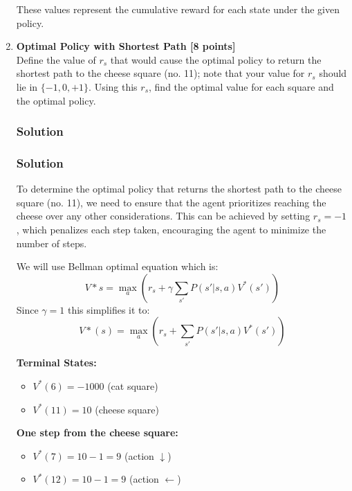 \documentclass{article}
\begin{document}
\begin{enumerate}[label=(\alph*)]
    These values represent the cumulative reward for each state under the given policy.
    \item \textbf{Optimal Policy with Shortest Path [8 points]} \\
    Define the value of $r_s$ that would cause the optimal policy to return the shortest path to the cheese square (no. 11); note that your value for $r_s$ should lie in $\{-1, 0, +1\}$. Using this $r_s$, find the optimal value for each square and the optimal policy.
    \subsubsection*{Solution}
    \subsubsection*{Solution}
    To determine the optimal policy that returns the shortest path to the cheese square (no. 11), we need to ensure that the agent prioritizes reaching the cheese over any other considerations. This can be achieved by setting \( r_s = -1 \), which penalizes each step taken, encouraging the agent to minimize the number of steps.


    We will use Bellman optimal equation which is:
    \[
    V*s = \max_a \left( r_s + \gamma \sum_{s'} P(s'|s, a)V^*(s') \right)
    \]
    Since $\gamma  = 1$ this simplifies it to:
    \[
    V*(s) = \max_a \left( r_s + \sum_{s'} P(s'|s, a)V^*(s') \right)
    \]

    \textbf{Terminal States:}
    \begin{itemize}
        \item \( V^*(6) = -1000 \) (cat square)
        \item \( V^*(11) = 10 \) (cheese square)
    \end{itemize}

    \textbf{One step from the cheese square:}
    \begin{itemize}
        \item \( V^*(7) = 10 - 1 = 9 \) (action $\downarrow$)
        \item \( V^*(12) = 10 - 1 = 9 \) (action $\leftarrow$)
    \end{itemize}


\end{enumerate}
\end{document}
